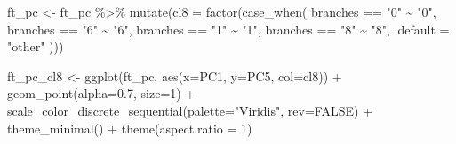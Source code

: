 \documentclass[
  letterpaper,
]{book}
\newenvironment{Shaded}{\begin{snugshade}}{\end{snugshade}}
\newcommand{\AttributeTok}[1]{\textcolor[rgb]{0.40,0.45,0.13}{#1}}
\newcommand{\ConstantTok}[1]{\textcolor[rgb]{0.56,0.35,0.01}{#1}}
\newcommand{\DecValTok}[1]{\textcolor[rgb]{0.68,0.00,0.00}{#1}}
\newcommand{\FloatTok}[1]{\textcolor[rgb]{0.68,0.00,0.00}{#1}}
\newcommand{\FunctionTok}[1]{\textcolor[rgb]{0.28,0.35,0.67}{#1}}
\newcommand{\NormalTok}[1]{\textcolor[rgb]{0.00,0.23,0.31}{#1}}
\newcommand{\OtherTok}[1]{\textcolor[rgb]{0.00,0.23,0.31}{#1}}
\newcommand{\SpecialCharTok}[1]{\textcolor[rgb]{0.37,0.37,0.37}{#1}}
\newcommand{\StringTok}[1]{\textcolor[rgb]{0.13,0.47,0.30}{#1}}
\begin{document}
\begin{Shaded}
\begin{Highlighting}[]
\NormalTok{ft\_pc }\OtherTok{\textless{}{-}}\NormalTok{ ft\_pc }\SpecialCharTok{\%\textgreater{}\%}
  \FunctionTok{mutate}\NormalTok{(}\AttributeTok{cl8 =} \FunctionTok{factor}\NormalTok{(}\FunctionTok{case\_when}\NormalTok{(}
\NormalTok{                 branches }\SpecialCharTok{==} \StringTok{"0"} \SpecialCharTok{\textasciitilde{}} \StringTok{"0"}\NormalTok{,}
\NormalTok{                 branches }\SpecialCharTok{==} \StringTok{"6"} \SpecialCharTok{\textasciitilde{}} \StringTok{"6"}\NormalTok{,}
\NormalTok{                 branches }\SpecialCharTok{==} \StringTok{"1"} \SpecialCharTok{\textasciitilde{}} \StringTok{"1"}\NormalTok{,}
\NormalTok{                 branches }\SpecialCharTok{==} \StringTok{"8"} \SpecialCharTok{\textasciitilde{}} \StringTok{"8"}\NormalTok{,}
                 \AttributeTok{.default =} \StringTok{"other"}
\NormalTok{  )))}
\end{Highlighting}
\end{Shaded}

\begin{Shaded}
\end{Shaded}

\begin{Shaded}
\begin{Highlighting}[]
\NormalTok{ft\_pc\_cl8 }\OtherTok{\textless{}{-}} \FunctionTok{ggplot}\NormalTok{(ft\_pc, }\FunctionTok{aes}\NormalTok{(}\AttributeTok{x=}\NormalTok{PC1, }\AttributeTok{y=}\NormalTok{PC5, }\AttributeTok{col=}\NormalTok{cl8)) }\SpecialCharTok{+}
  \FunctionTok{geom\_point}\NormalTok{(}\AttributeTok{alpha=}\FloatTok{0.7}\NormalTok{, }\AttributeTok{size=}\DecValTok{1}\NormalTok{) }\SpecialCharTok{+}
  \FunctionTok{scale\_color\_discrete\_sequential}\NormalTok{(}\AttributeTok{palette=}\StringTok{"Viridis"}\NormalTok{, }\AttributeTok{rev=}\ConstantTok{FALSE}\NormalTok{) }\SpecialCharTok{+}
  \FunctionTok{theme\_minimal}\NormalTok{() }\SpecialCharTok{+}
  \FunctionTok{theme}\NormalTok{(}\AttributeTok{aspect.ratio =} \DecValTok{1}\NormalTok{)}
\end{Highlighting}
\end{Shaded}
\end{document}
